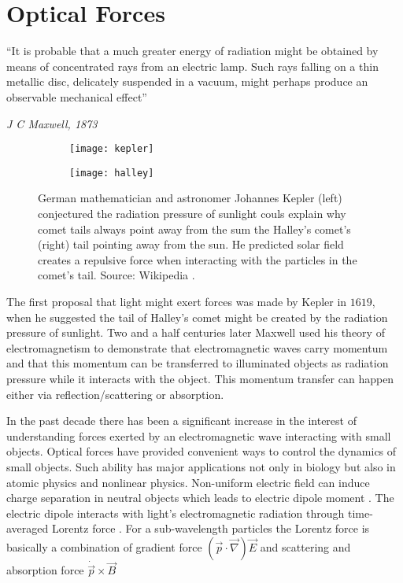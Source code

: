 \section{Optical Forces}

\setlength{\epigraphwidth}{0.8\textwidth}
\epigraph{``It is probable that a much greater energy of radiation might be obtained by means of concentrated rays from an electric lamp. Such rays falling on a thin metallic disc, delicately suspended in a vacuum, might perhaps produce an observable mechanical effect''}{\textit{J C Maxwell, 1873}}

\begin{figure}
\begin{subfigure}{.4\textwidth}
  \centering
  \texttt{[image: kepler]}
  \label{fig:kepler}
\end{subfigure}%
\begin{subfigure}{.4\textwidth}
  \centering
  \texttt{[image: halley]}
  \label{fig:halley}
\end{subfigure}
\caption{German mathematician and astronomer Johannes Kepler (left) conjectured the radiation pressure of sunlight couls explain why comet tails always point away from the sum the Halley's comet's (right) tail pointing away from the sun. He predicted solar field creates a repulsive force when interacting with the particles in the comet's tail. Source: Wikipedia \cite{kepler_pic, halley_comet}.}
\label{fig:kepler_halley}
\end{figure}

The first proposal that light might exert forces was made by Kepler in $1619$, when he suggested the tail of Halley's comet might be created by the radiation pressure of sunlight. Two and a half centuries later Maxwell used his theory of electromagnetism to demonstrate that electromagnetic waves carry momentum and that this momentum can be transferred to illuminated objects as radiation pressure while it interacts with the object. This momentum transfer can happen either via reflection/scattering or absorption. 

In the past decade there has been a significant increase in the interest of understanding forces exerted by an electromagnetic wave interacting with small objects. Optical forces have provided convenient ways to control the dynamics of small objects. Such ability has major applications not only in biology but also in atomic physics and nonlinear physics. Non-uniform electric field can induce charge separation in neutral objects which leads to electric dipole moment \cite{jackson_classical_1999}. The electric dipole interacts with light's electromagnetic radiation through time-averaged Lorentz force \cite{Chaumet:00, gordon1973, Dungey:91}. For a sub-wavelength particles the Lorentz force is basically a combination of gradient force $(\vec{p}\cdot \vec{\nabla})\vec{E}$ and scattering and absorption force $\dot{\vec{p}}\times \vec{B}$ \cite{gordon1973}

